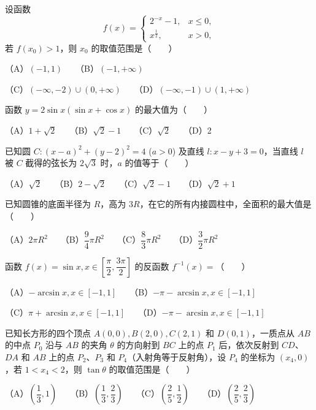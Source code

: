 \begin{question}
设函数
\nopagebreak[4]
\[f(x) = \begin{cases} 2^{-x} - 1, & x \le 0, \\ x^{\frac{1}{2}}, & x > 0, \end{cases}\]
若 $f(x_0) > 1$，则 $x_0$ 的取值范围是\mbox{（　　）}

（A）$(-1, 1)$　　（B）$(-1, +\infty)$

（C）$(-\infty, -2) \cup (0, +\infty)$　　（D）$(-\infty, -1) \cup (1, +\infty)$

\end{question}
\begin{question}
函数 $y = 2\sin x(\sin x + \cos x)$ 的最大值为\mbox{（　　）}

（A）$1 + \sqrt{2}$　　（B）$\sqrt{2} - 1$　　（C）$\sqrt{2}$　　（D）2

\end{question}
\begin{question}
已知圆 $C: (x - a)^2 + (y - 2)^2 = 4$ ($a > 0$) 及直线 $l: x - y + 3 = 0$，当直线 $l$ 被 $C$ 截得的弦长为 $2\sqrt{3}$ 时，$a$ 的值等于\mbox{（　　）}

（A）$\sqrt{2}$　　（B）$2 - \sqrt{2}$　　（C）$\sqrt{2} - 1$　　（D）$\sqrt{2} + 1$

\end{question}
\begin{question}
已知圆锥的底面半径为 $R$，高为 $3R$，在它的所有内接圆柱中，全面积的最大值是\mbox{（　　）}

（A）$2\pi R^2$　　（B）$\dfrac{9}{4}\pi R^2$　　（C）$\dfrac{8}{3}\pi R^2$　　（D）$\dfrac{3}{2}\pi R^2$

\end{question}
\begin{question}
函数 $f(x) = \sin x, x \in \left[\dfrac{\pi}{2}, \dfrac{3\pi}{2}\right]$ 的反函数 $f^{-1}(x) =$\mbox{（　　）}

（A）$-\arcsin x, x \in [-1, 1]$　　（B）$-\pi - \arcsin x, x \in [-1, 1]$

（C）$\pi + \arcsin x, x \in [-1, 1]$　　（D）$-\pi - \arcsin x, x \in [-1, 1]$

\end{question}
\begin{question}
已知长方形的四个顶点 $A(0, 0), B(2, 0), C(2, 1)$ 和 $D(0, 1)$，一质点从 $AB$ 的中点 $P_0$ 沿与 $AB$ 的夹角 $\theta$ 的方向射到 $BC$ 上的点 $P_1$ 后，依次反射到 $CD$、$DA$ 和 $AB$ 上的点 $P_2$、$P_3$ 和 $P_4$（入射角等于反射角），设 $P_4$ 的坐标为 $(x_4, 0)$，若 $1 < x_4 < 2$，则 $\tan\theta$ 的取值范围是\mbox{（　　）}

（A）$\left(\dfrac{1}{3}, 1\right)$　　（B）$\left(\dfrac{1}{3}, \dfrac{2}{3}\right)$　　（C）$\left(\dfrac{2}{5}, \dfrac{1}{2}\right)$　　（D）$\left(\dfrac{2}{5}, \dfrac{2}{3}\right)$

\end{question}
